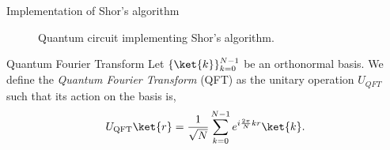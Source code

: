 \begin{frame}{Implementation of Shor's algorithm}
			\begin{figure}[H]
				\centering
{}
				\caption{Quantum circuit implementing Shor's algorithm.}
				\label{fig:shor_qc}
				
			\end{figure}


\begin{block}{Quantum Fourier Transform}
Let $\{\ket{k}\}_{k=0}^{N-1}$ be an orthonormal basis. We define the \textit{Quantum Fourier Transform} (QFT) as the unitary operation $U_{QFT}$ such that its action on the basis is,
\[U_{\text{QFT}}\ket{r}=\frac{1}{\sqrt{N}}\sum_{k=0}^{N-1}e^{i\frac{2\pi}{N}kr}\ket{k}.\]
\end{block}

\end{frame}